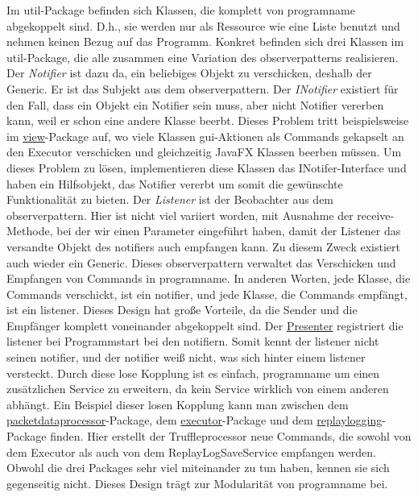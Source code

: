 \medskip
Im util-Package befinden sich Klassen, die komplett von \gls{programname} abgekoppelt
sind. D.h., sie werden nur als Ressource wie eine Liste benutzt und nehmen keinen
Bezug auf das Programm. Konkret befinden sich drei Klassen im util-Package, die alle zusammen eine
Variation des \gls{observerpattern}s realisieren. Der \textit{Notifier} ist dazu da,
ein beliebiges Objekt zu verschicken, deshalb der Generic. Er ist das Subjekt aus
dem \gls{observerpattern}.
\newline
\newline
Der \textit{INotifier} existiert für den Fall, dass ein
Objekt ein Notifier sein muss, aber nicht Notifier vererben kann, weil er
schon eine andere Klasse beerbt. Dieses Problem tritt beispielsweise im
\hyperref[subsec:view]{view}-Package auf, wo viele Klassen \gls{gui}-Aktionen als Commands
gekapselt an den Executor verschicken und gleichzeitig JavaFX Klassen beerben müssen.
Um dieses Problem zu lösen, implementieren diese Klassen das INotifer-Interface
und haben ein Hilfsobjekt, das Notifier vererbt um somit die gewünschte Funktionalität zu
bieten.
\newline
\newline
Der \textit{Listener} ist der Beobachter aus dem \gls{observerpattern}. Hier ist nicht
viel variiert worden, mit Ausnahme der receive-Methode, bei der wir einen Parameter eingeführt
haben, damit der Listener das versandte Objekt des \gls{notifier}s auch empfangen kann.
Zu diesem Zweck existiert auch wieder ein Generic.
\newline
\newline
Dieses \gls{observerpattern} verwaltet das Verschicken und Empfangen von Commands in
\gls{programname}. In anderen Worten, jede Klasse, die Commands verschickt, ist ein
\gls{notifier}, und jede Klasse, die Commands empfängt, ist ein \gls{listener}. Dieses Design
hat große Vorteile, da die Sender und die Empfänger komplett voneinander abgekoppelt
sind. Der \hyperref[subsec:presenter]{Presenter} registriert die \gls{listener} bei Programmstart
bei den \gls{notifier}n. Somit kennt der \gls{listener} nicht seinen \gls{notifier}, und der
\gls{notifier} weiß nicht, was sich hinter einem \gls{listener} versteckt. Durch diese lose
Kopplung ist es einfach, \gls{programname} um einen zusätzlichen Service zu erweitern,
da kein Service wirklich von einem anderen abhängt.
\newline
\newline
Ein Beispiel dieser losen Kopplung kann man zwischen dem
\hyperref[subsubsec:packetdataprocessor]{packetdataprocessor}-Package, dem
\hyperref[subsubsec:executor]{executor}-Package und dem
\hyperref[subsubsec:replaylogging]{replaylogging}-Package finden. Hier erstellt
der Truffleprocessor neue Commands, die sowohl von dem Executor als auch von dem
ReplayLogSaveService empfangen werden. Obwohl die drei Packages sehr viel
miteinander zu tun haben, kennen sie sich gegenseitig nicht. Dieses Design
trägt zur Modularität von \gls{programname} bei.
